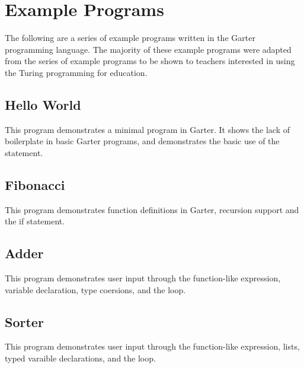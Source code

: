 \glsresetall %
\chapter{Example Programs}\label{ch:ExamplePrograms}

The following are a series of example programs written in the Garter programming
language. The majority of these example programs were adapted from the series of
example programs to be shown to teachers interested in using the Turing
programming for education.

\section{Hello World}

This program demonstrates a minimal program in Garter. It shows the lack of
boilerplate in basic Garter programs, and demonstrates the basic use of
the  statement.



\section{Fibonacci}

This program demonstrates function definitions in Garter, recursion support
and the if statement.



\section{Adder}

This program demonstrates user input through the  function-like
expression, variable declaration, type coersions, and the  loop.



\section{Sorter}

This program demonstrates user input through the  function-like
expression, lists, typed varaible declarations, and the  loop.



